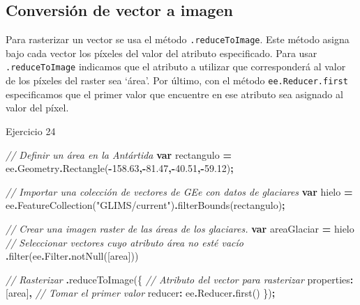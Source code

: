 \documentclass[
  12pt,
  letterpaper,
  twoside]{book}
\newenvironment{Shaded}{\begin{snugshade}}{\end{snugshade}}
\newcommand{\AttributeTok}[1]{\textcolor[rgb]{0.77,0.63,0.00}{#1}}
\newcommand{\CommentTok}[1]{\textcolor[rgb]{0.56,0.35,0.01}{\textit{#1}}}
\newcommand{\DataTypeTok}[1]{\textcolor[rgb]{0.13,0.29,0.53}{#1}}
\newcommand{\FloatTok}[1]{\textcolor[rgb]{0.00,0.00,0.81}{#1}}
\newcommand{\FunctionTok}[1]{\textcolor[rgb]{0.00,0.00,0.00}{#1}}
\newcommand{\KeywordTok}[1]{\textcolor[rgb]{0.13,0.29,0.53}{\textbf{#1}}}
\newcommand{\NormalTok}[1]{#1}
\newcommand{\OperatorTok}[1]{\textcolor[rgb]{0.81,0.36,0.00}{\textbf{#1}}}
\newcommand{\StringTok}[1]{\textcolor[rgb]{0.31,0.60,0.02}{#1}}
\begin{document}
\hypertarget{conversiuxf3n-de-vector-a-imagen}{%
\subsection{Conversión de vector a imagen}\label{conversiuxf3n-de-vector-a-imagen}}

Para rasterizar un vector se usa el método \texttt{.reduceToImage}. Este método asigna bajo cada vector los píxeles del valor del atributo especificado. Para usar \texttt{.reduceToImage} indicamos que el atributo a utilizar que corresponderá al valor de los píxeles del raster sea `área'. Por último, con el método \texttt{ee.Reducer.first} especificamos que el primer valor que encuentre en ese atributo sea asignado al valor del píxel.

Ejercicio 24

\begin{Shaded}
\begin{Highlighting}[]
\CommentTok{// Definir un área en la Antártida}
\KeywordTok{var}\NormalTok{ rectangulo }\OperatorTok{=}\NormalTok{ ee}\OperatorTok{.}\AttributeTok{Geometry}\OperatorTok{.}\FunctionTok{Rectangle}\NormalTok{(}\OperatorTok{{-}}\FloatTok{158.63}\OperatorTok{,{-}}\FloatTok{81.47}\OperatorTok{,{-}}\FloatTok{40.51}\OperatorTok{,{-}}\FloatTok{59.12}\NormalTok{)}\OperatorTok{;}

\CommentTok{// Importar una colección de vectores de GEe con datos de glaciares}
\KeywordTok{var}\NormalTok{ hielo }\OperatorTok{=}\NormalTok{ ee}\OperatorTok{.}\FunctionTok{FeatureCollection}\NormalTok{(}\StringTok{"GLIMS/current"}\NormalTok{)}\OperatorTok{.}\FunctionTok{filterBounds}\NormalTok{(rectangulo)}\OperatorTok{;}

\CommentTok{// Crear una imagen raster de las áreas de los glaciares.}
\KeywordTok{var}\NormalTok{ areaGlaciar }\OperatorTok{=}\NormalTok{ hielo}
\CommentTok{// Seleccionar vectores cuyo atributo área no esté vacío}
    \OperatorTok{.}\FunctionTok{filter}\NormalTok{(ee}\OperatorTok{.}\AttributeTok{Filter}\OperatorTok{.}\FunctionTok{notNull}\NormalTok{([}\StringTok{\textquotesingle{}area\textquotesingle{}}\NormalTok{])) }
    
\CommentTok{// Rasterizar  }
\OperatorTok{.}\FunctionTok{reduceToImage}\NormalTok{(\{}
    \CommentTok{// Atributo del vector para rasterizar}
    \DataTypeTok{properties}\OperatorTok{:}\NormalTok{ [}\StringTok{\textquotesingle{}area\textquotesingle{}}\NormalTok{]}\OperatorTok{,} 
    \CommentTok{// Tomar el primer valor}
    \DataTypeTok{reducer}\OperatorTok{:}\NormalTok{ ee}\OperatorTok{.}\AttributeTok{Reducer}\OperatorTok{.}\FunctionTok{first}\NormalTok{()  }
\NormalTok{    \})}\OperatorTok{;}
\end{Highlighting}
\end{Shaded}
\end{document}
